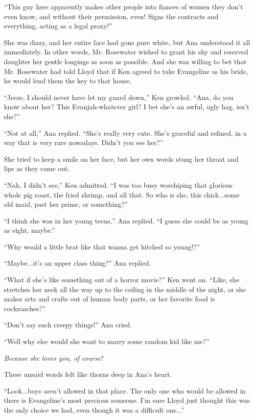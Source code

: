 \documentclass[
]{article}
\begin{document}
``This guy here apparently makes other people into fiances of women they
don't even know, and without their permission, even! Signs the contracts
and everything, acting as a legal proxy!''

She was dizzy, and her entire face had gone pure white, but Ana
understood it all immediately. In other words, Mr. Rosewater wished to
grant his shy and reserved daughter her gentle longings as soon as
possible. And she was willing to bet that Mr. Rosewater had told Lloyd
that if Ken agreed to take Evangeline as his bride, he would lend them
the key to that house.

``Jeeze, I should never have let my guard down,'' Ken growled. ``Ana, do
you know about her? This Evanjah-whatever girl? I bet she's an awful,
ugly hag, isn't she?''

``Not at all,'' Ana replied. ``She's really very cute. She's graceful
and refined, in a way that is very rare nowadays. Didn't you see her?''

She tried to keep a smile on her face, but her own words stung her
throat and lips as they came out.

``Nah, I didn't see,'' Ken admitted. ``I was too busy worshiping that
glorious whole pig roast, the fried shrimp, and all that. So who is she,
this chick...some old maid, past her prime, or something?''

``I think she was in her young teens,'' Ana replied. ``I guess she could
be as young as eight, maybe.''

``Why would a little brat like that wanna get hitched so young!?''

``Maybe...it's an upper class thing?'' Ana replied.

``What if she's like something out of a horror movie?'' Ken went on.
``Like, she stretches her neck all the way up to the ceiling in the
middle of the night, or she makes arts and crafts out of human body
parts, or her favorite food is cockroaches?''

``Don't say such creepy things!'' Ana cried.

``Well why else would she want to marry some random kid like me?''

\emph{Because she loves you, of course!}

These unsaid words felt like thorns deep in Ana's heart.

``Look...boys aren't allowed in that place. The only one who would be
allowed in there is Evangeline's most precious someone. I'm sure Lloyd
just thought this was the only choice we had, even though it was a
difficult one...''
\end{document}
